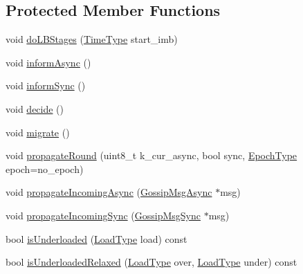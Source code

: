 \subsection*{Protected Member Functions}
\begin{DoxyCompactItemize}
\item 
void \hyperlink{structvt_1_1vrt_1_1collection_1_1lb_1_1_gossip_l_b_ad81a46fc5bb4cee34bca9740e685d7f7}{do\+L\+B\+Stages} (\hyperlink{namespacevt_a876a9d0cd5a952859c72de8a46881442}{Time\+Type} start\+\_\+imb)
\item 
void \hyperlink{structvt_1_1vrt_1_1collection_1_1lb_1_1_gossip_l_b_a71b90eeaacc24ea015f174ce874b674a}{inform\+Async} ()
\item 
void \hyperlink{structvt_1_1vrt_1_1collection_1_1lb_1_1_gossip_l_b_a737f271e9b22a0219af5344da80496be}{inform\+Sync} ()
\item 
void \hyperlink{structvt_1_1vrt_1_1collection_1_1lb_1_1_gossip_l_b_a2a990e5bdf182e4705a4ee4082e267a3}{decide} ()
\item 
void \hyperlink{structvt_1_1vrt_1_1collection_1_1lb_1_1_gossip_l_b_ab4ea54ee62ebad9105d79ece61f41b50}{migrate} ()
\item 
void \hyperlink{structvt_1_1vrt_1_1collection_1_1lb_1_1_gossip_l_b_a074cedc788a62dec256af4e2571f96af}{propagate\+Round} (uint8\+\_\+t k\+\_\+cur\+\_\+async, bool sync, \hyperlink{namespacevt_a985a5adf291c34a3ca263b3378388236}{Epoch\+Type} epoch=no\+\_\+epoch)
\item 
void \hyperlink{structvt_1_1vrt_1_1collection_1_1lb_1_1_gossip_l_b_acbba727a4d2f6808bd32970b2607f2c6}{propagate\+Incoming\+Async} (\hyperlink{structvt_1_1vrt_1_1collection_1_1lb_1_1_gossip_l_b_a6da4208feb7b153c54595d06f82d5e56}{Gossip\+Msg\+Async} $\ast$msg)
\item 
void \hyperlink{structvt_1_1vrt_1_1collection_1_1lb_1_1_gossip_l_b_a63a627a782289c20d5b03401deb94612}{propagate\+Incoming\+Sync} (\hyperlink{structvt_1_1vrt_1_1collection_1_1lb_1_1_gossip_l_b_a39aebe4c174695c551b5b9a907bac615}{Gossip\+Msg\+Sync} $\ast$msg)
\item 
bool \hyperlink{structvt_1_1vrt_1_1collection_1_1lb_1_1_gossip_l_b_a8714236643dcb620aa29956a6ff26b48}{is\+Underloaded} (\hyperlink{structvt_1_1vrt_1_1collection_1_1lb_1_1_base_l_b_a215e22b9f12678303f49615ae3be05cc}{Load\+Type} load) const
\item 
bool \hyperlink{structvt_1_1vrt_1_1collection_1_1lb_1_1_gossip_l_b_a292dbba1aaa750b5c1303570874d5e38}{is\+Underloaded\+Relaxed} (\hyperlink{structvt_1_1vrt_1_1collection_1_1lb_1_1_base_l_b_a215e22b9f12678303f49615ae3be05cc}{Load\+Type} over, \hyperlink{structvt_1_1vrt_1_1collection_1_1lb_1_1_base_l_b_a215e22b9f12678303f49615ae3be05cc}{Load\+Type} under) const

\end{DoxyCompactItemize}
